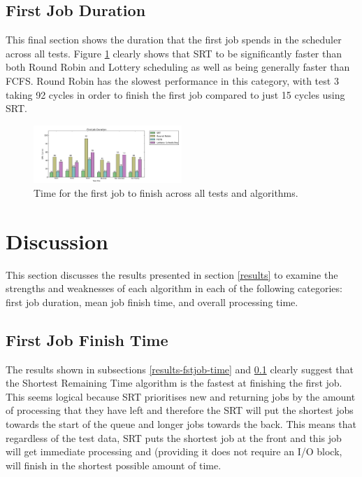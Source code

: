 \documentclass{acm_proc_article-sp}
\begin{document}
\subsection{First Job Duration}
\label{results-fstjob-duration}
This final section shows the duration that the first job spends in the scheduler across all tests. Figure \ref{fig:fstjob-duration} clearly shows that SRT to be significantly faster than both Round Robin and Lottery scheduling as well as being generally faster than FCFS. Round Robin has the slowest performance in this category, with test 3 taking 92 cycles in order to finish the first job compared to just 15 cycles using SRT.

\begin{figure}[H]
\centering
\includegraphics[width=0.5\textwidth]{fstjob_duration.png}
\caption{Time for the first job to finish across all tests and algorithms.}
\label{fig:fstjob-duration}
\end{figure}

\section{Discussion}
This section discusses the results presented in section \ref{results} to examine the strengths and weaknesses of each algorithm in each of the following categories: first job duration, mean job finish time, and overall processing time.

\subsection{First Job Finish Time}
The results shown in subsections \ref{results-fstjob-time} and \ref{results-fstjob-duration} clearly suggest that the Shortest Remaining Time algorithm is the fastest at finishing the first job. This seems logical because SRT prioritises new and returning jobs by the amount of processing that they have left and therefore the SRT will put the shortest jobs towards the start of the queue and longer jobs towards the back. This means that regardless of the test data, SRT puts the shortest job at the front and this job will get immediate processing and (providing it does not require an I/O block, will finish in the shortest possible amount of time.
\end{document}
